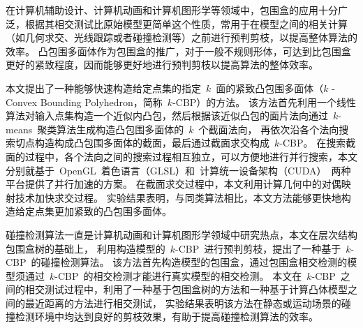\begin{cabstract}
  
在计算机辅助设计、计算机动画和计算机图形学等领域中，包围盒的应用十分广泛，根据其相交测试比原始模型更简单这个性质，常用于在模型之间的相关计算（如几何求交、光线跟踪或者碰撞检测等）之前进行预判剪枝，以提高整体算法的效率。
凸包围多面体作为包围盒的推广，对于一般不规则形体，可达到比包围盒更好的紧致程度，因而能够更好地进行预判剪枝以提高算法的整体效率。

本文提出了一种能够快速构造给定点集的指定~$k$~面的紧致凸包围多面体（$k$ - Convex Bounding Polyhedron，简称~$k$-CBP）的方法。
该方法首先利用一个线性算法对输入点集构造一个近似内凸包，然后根据该近似凸包的面片法向通过~$k$-means~聚类算法生成构造凸包围多面体的~$k$~个截面法向，
再依次沿各个法向搜索切点构造构成凸包围多面体的截面，最后通过截面求交构成~$k$-CBP。 
在搜索截面的过程中，各个法向之间的搜索过程相互独立，可以方便地进行并行搜索，本文分别就基于~OpenGL~着色语言（GLSL）和~计算统一设备架构（CUDA）~两种平台提供了并行加速的方案。
在截面求交过程中，本文利用计算几何中的对偶映射技术加快求交过程。
实验结果表明，与同类算法相比，本文方法能够更快地构造给定点集更加紧致的凸包围多面体。

碰撞检测算法一直是计算机动画和计算机图形学领域中研究热点，本文在层次结构包围盒树的基础上，
利用构造模型的~$k$-CBP~进行预判剪枝，提出了一种基于~$k$-CBP~的碰撞检测算法。
该方法首先构造模型的包围盒，通过包围盒相交检测的模型须通过~$k$-CBP~的相交检测才能进行真实模型的相交检测。
本文在~$k$-CBP~之间的相交测试过程中，利用了一种基于包围盒树的方法和一种基于计算凸体模型之间的最近距离的方法进行相交测试，
实验结果表明该方法在静态或运动场景的碰撞检测环境中均达到良好的剪枝效果，有助于提高碰撞检测算法的效率。



\end{cabstract}


